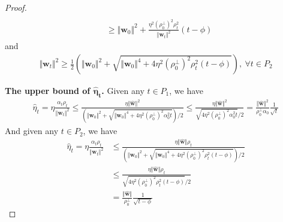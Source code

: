 \documentclass[10pt,a4paper]{amsart}
\begin{document}
\begin{proof}
\begin{equation*}
\begin{aligned}
    \\ & \ge
    \Vert \mathbf{w}_{0} \Vert^2
    +
    \frac{
      \eta^2 \left(\rho_{0}^{\perp}\right)^2 \rho_{t}^2
    }{
      \Vert \mathbf{w}_{t} \Vert^2
    }
    \left( t - \phi \right)
  \end{aligned}
  \end{equation*}
  and
  \begin{equation*}
  \begin{aligned}
    \Vert \mathbf{w}_t \Vert^2 \ge 
    \frac{1}{2}
    \left(
      \Vert \mathbf{w}_0 \Vert^2 + 
      \sqrt{
        \Vert \mathbf{w}_0 \Vert^4 + 4  
        \eta^2 \left(\rho_{0}^{\perp}\right)^2
        \rho_{t}^2 \left(
          t - \phi
        \right)
      }
    \right),
    \ \forall t \in P_2
  \end{aligned}
  \end{equation*}

  \noindent\textbf{The upper bound of $\boldsymbol{\hat{\eta}_t}$.} 
  Given any $t \in P_1$, we have 
  \begin{equation*}
  \begin{aligned}
    \hat{\eta}_t = \eta \frac{\alpha_t \rho_t}{\Vert \mathbf{w}_t \Vert^2}
    \le 
    \frac{\eta \Vert \hat{\mathbf{w}} \Vert^2}{
      \left(
        \Vert \mathbf{w}_0 \Vert^2 + 
        \sqrt{
          \Vert \mathbf{w}_0 \Vert^4 + 4 \eta^2 (\rho_{0}^{\perp})^2 \alpha_0^2 t
        }
      \right) / 2
    }
    \le 
    \frac{\eta \Vert \hat{\mathbf{w}} \Vert^2}{
      \sqrt{
        4 \eta^2 (\rho_{0}^{\perp})^2 \alpha_0^2 t
      }
    / 2}
    = 
    \frac{\Vert \hat{\mathbf{w}} \Vert^2 }{
        \rho_{0}^{\perp} \alpha_0
    }
    \frac{1}{ \sqrt{t}}
  \end{aligned}
  \end{equation*}
  And given any $t \in P_2$, we have 
  \begin{equation*}
  \begin{aligned}
    \hat{\eta}_t = \eta \frac{\alpha_t \rho_t}{\Vert \mathbf{w}_t \Vert^2}
    & \le 
    \frac{\eta \Vert \hat{\mathbf{w}} \Vert \rho_t}{
      \left(
        \Vert \mathbf{w}_0 \Vert^2 + 
        \sqrt{
          \Vert \mathbf{w}_0 \Vert^4 + 4  
          \eta^2 \left(\rho_{0}^{\perp}\right)^2
          \rho_{t}^2 \left(
            t - \phi
          \right)
        }
      \right) / 2
    }
    \\ & \le 
    \frac{\eta \Vert \hat{\mathbf{w}} \Vert \rho_t}{
      \sqrt{
        4 \eta^2 \left(\rho_{0}^{\perp}\right)^2
        \rho_{t}^2 \left(
          t - \phi 
        \right)
      }
    / 2}
    \\ & = 
    \frac{\Vert \hat{\mathbf{w}} \Vert}{\rho_{0}^{\perp}}
    \frac{1}{\sqrt{t - \phi }}
  \end{aligned}
  \end{equation*}


\end{proof}
\end{document}
